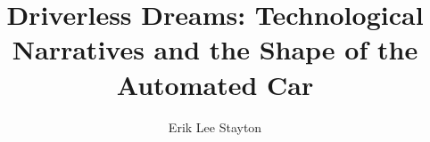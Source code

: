 % 
% 
%
%
%
%
%
%
%
% 
% 

\title{Driverless Dreams: Technological Narratives and the Shape of
  the Automated Car}




\author{Erik Lee Stayton}

